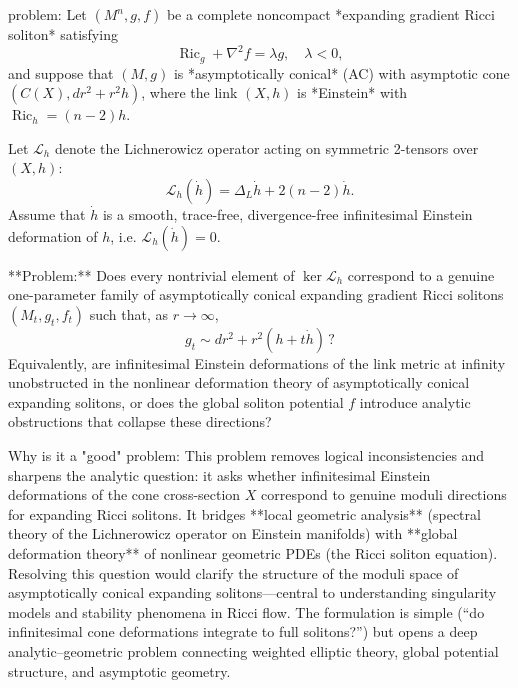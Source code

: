 problem:  
Let \((M^n, g, f)\) be a complete noncompact *expanding gradient Ricci soliton* satisfying  
\[
\operatorname{Ric}_g + \nabla^2 f = \lambda g, \quad \lambda < 0,
\]  
and suppose that \((M,g)\) is *asymptotically conical* (AC) with asymptotic cone \((C(X),dr^2 + r^2 h)\), where the link \((X,h)\) is *Einstein* with \(\operatorname{Ric}_h = (n-2)h\).  

Let \(\mathcal{L}_h\) denote the Lichnerowicz operator acting on symmetric 2-tensors over \((X,h)\):
\[
\mathcal{L}_h(\dot{h}) = \Delta_L \dot{h} + 2(n-2)\dot{h}.
\]
Assume that \(\dot{h}\) is a smooth, trace-free, divergence-free infinitesimal Einstein deformation of \(h\), i.e. \(\mathcal{L}_h(\dot{h}) = 0.\)

**Problem:**  
Does every nontrivial element of \(\ker \mathcal{L}_h\) correspond to a genuine one-parameter family of asymptotically conical expanding gradient Ricci solitons \((M_t, g_t, f_t)\) such that, as \(r\to\infty\),
\[
g_t \sim dr^2 + r^2 (h + t \dot{h})\, ?
\]
Equivalently, are infinitesimal Einstein deformations of the link metric at infinity unobstructed in the nonlinear deformation theory of asymptotically conical expanding solitons, or does the global soliton potential \(f\) introduce analytic obstructions that collapse these directions?

Why is it a "good" problem:  
This problem removes logical inconsistencies and sharpens the analytic question: it asks whether infinitesimal Einstein deformations of the cone cross-section \(X\) correspond to genuine moduli directions for expanding Ricci solitons. It bridges **local geometric analysis** (spectral theory of the Lichnerowicz operator on Einstein manifolds) with **global deformation theory** of nonlinear geometric PDEs (the Ricci soliton equation). Resolving this question would clarify the structure of the moduli space of asymptotically conical expanding solitons—central to understanding singularity models and stability phenomena in Ricci flow. The formulation is simple (“do infinitesimal cone deformations integrate to full solitons?”) but opens a deep analytic–geometric problem connecting weighted elliptic theory, global potential structure, and asymptotic geometry.